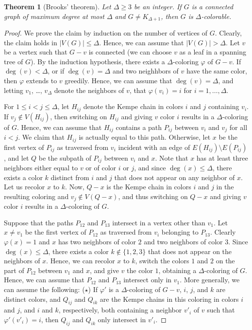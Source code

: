 \documentclass[12pt,twoside,openright,a4paper]{book}
\newtheorem{theorem}{Theorem}[chapter]
\begin{document}
\begin{theorem}[Brooks' theorem]
Let $\Delta\ge 3$ be an integer.
If $G$ is a connected graph of maximum degree at most $\Delta$ and $G\neq K_{\Delta+1}$,
then $G$ is $\Delta$-colorable.
\end{theorem}
\begin{proof}
We prove the claim by induction on the number of vertices of $G$.  Clearly, the claim holds in $|V(G)|\le \Delta$.
Hence, we can assume that $|V(G)|>\Delta$.  Let $v$ be a vertex such that $G-v$ is connected (we can choose $v$ as
a leaf in a spanning tree of $G$).  By the induction hypothesis, there exists a $\Delta$-coloring $\varphi$ of $G-v$.
If $\deg(v)<\Delta$, or if $\deg(v)=\Delta$ and two neighhbors of $v$ have the same color, then $\varphi$ extends to $v$ greedily.
Hence, we can assume that $\deg(v)=\Delta$, and letting $v_1$, \ldots, $v_\Delta$ denote the neighbors of $v$, that
$\varphi(v_i)=i$ for $i=1,\ldots,\Delta$.

For $1\le i<j\le \Delta$, let $H_{ij}$ denote the Kempe chain in colors $i$ and $j$ containing $v_i$.  If $v_j\not\in V(H_{ij})$,
then switching on $H_{ij}$ and giving $v$ color $i$ results in a $\Delta$-coloring of $G$.  Hence, we can assume that $H_{ij}$ contains
a path $P_{ij}$ between $v_i$ and $v_j$ for all $i<j$.  We claim that $H_{ij}$ is actually equal to this path.  Otherwise,
let $x$ be the first vertex of $P_{ij}$ as traversed from $v_i$ incident with an edge of $E(H_{ij})\setminus E(P_{ij})$, and let
$Q$ be the subpath of $P_{ij}$ between $v_i$ and $x$.  Note that $x$ has at least three neighbors either equal to $v$ or of color $i$ or $j$,
and since $\deg(x)\le\Delta$, there exists a color $k$ distinct from $i$ and $j$ that does not appear on any neighbor of $x$.
Let us recolor $x$ to $k$.  Now, $Q-x$ is the Kempe chain in colors $i$ and $j$ in the resulting coloring and $v_j\not\in V(Q-x)$,
and thus switching on $Q-x$ and giving $v$ color $i$ results in a $\Delta$-coloring of $G$.

Suppose that the paths $P_{12}$ and $P_{13}$ intersect in a vertex other than $v_1$.  Let $x\neq v_1$ be
the first vertex of $P_{12}$ as traversed from $v_i$ belonging to $P_{13}$.  Clearly $\varphi(x)=1$ and $x$ has two neighbors of color $2$
and two neighbors of color $3$.  Since $\deg(x)\le \Delta$, there exists a color $k\not\in\{1,2,3\}$ that does not appear on the neighbors of $x$.
Hence, we can recolor $x$ to $k$, switch the colors $1$ and $2$ on the part of $P_{12}$ between $v_1$ and $x$, and give $v$ the color $1$,
obtaining a $\Delta$-coloring of $G$.
Hence, we can assume that $P_{12}$ and $P_{13}$ intersect only in $v_1$.
More generally, we can assume the following: ($\star$) If $\varphi'$ is a $\Delta$-coloring of $G-v$, $i$, $j$, and $k$ are distinct colors,
and $Q_{ij}$ and $Q_{ik}$ are the Kempe chains in this coloring in colors $i$ and $j$, and $i$ and $k$, respectively, both containing
a neighbor $v'_i$ of $v$ such that $\varphi'(v'_i)=i$, then $Q_{ij}$ and $Q_{ik}$ only intersect in $v'_i$.


\end{proof}
\end{document}
